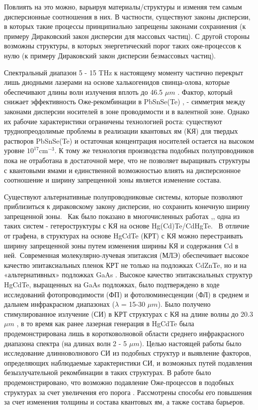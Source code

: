 \documentclass[../main.tex]{subfiles}
\begin{document}
Повлиять на это можно, варьируя материалы/структуры и изменяя тем самым дисперсионные соотношения в них. В частности,
существуют законы дисперсии, в которых такие процессы принципиально запрещены законами сохраниения (к примеру Дираковский 
закон дисперсии для массовых частиц). С другой стороны возможны структуры, в которых энергетический порог таких оже-процессов к нулю
(к примеру Дираковский закон дисперсии безмассовых частиц).

Спектральный диапазон 5 - 15 THz к настоящему моменту частично 
перекрыт лишь диодными лазерами на основе халькогенидов свинца-олова, которые обеспечивают длины 
волн излучения вплоть до 46.5 $\mu m$ \cite{Intro8}. Фактор, который снижает эффективность Оже-рекомбинации в PbSnSe(Te) \cite{Intro1}, \cite{Intro9}
- симметрия между законами дисперсии носителей в зоне проводимости и в валентной зоне. Однако их рабочие характеристики 
ограничены технологией роста: существуют труднопреодолимые проблемы в реализации квантовых ям (КЯ) для твердых растворов 
PbSnSe(Te) и остаточная концентрация носителей остается на высоком уровне $10^{17} \text{cm}^{-3}$. К тому же технология производства подобных
полупроводников пока не отработана в достаточной мере, что не позволяет выращивать структуры с квантовыми ямами и единственной возможностью
влиять на дисперсионное соотношение и ширину запрещенной зоны является изменение состава.

Существуют альтернативные полупроводниковые системы, которые позволяют
приблизиться к дираковскому закону дисперсии, но сохранить конечную ширину запрещенной зоны. 
Как было показано в многочисленных работах \cite{Rumyantsev:IOP:2018},\cite{Rumyantsev:2019}, одна из таких систем - гетероструктуры с КЯ на основе Hg(Cd)Te/CdHgTe. 
В отличие от графена, в структурах на основе HgCdTe (КРТ) с КЯ можно перестраивать ширину запрещенной зоны путем изменения ширины КЯ и 
содержания Cd в ней. Современная молекулярно-лучевая эпитаксия (МЛЭ) обеспечивает высокое качество эпитаксиальных пленок КРТ не только на подложках CdZnTe, 
но и на «альтернативных» подложках GaAs \cite{Varavin:2003}. Высокое качество эпитаксиальных структур \\HgCdTe, выращенных на GaAs подложках, было подтверждено в ходе исследований 
фотопроводимости (ФП) и фотолюминесценции (ФЛ) в среднем и дальнем инфракрасном диапазонах ($λ$ = 15-30 $\mu m$). Было получено 
стимулированное излучение (СИ) в КРТ структурах с КЯ на длине волны до 20.3 $\mu m$ \cite{Rumyantsev:IOP:2018}, в то время как ранее лазерная генерация в HgCdTe была 
продемонстрирована лишь в коротковолновой области среднего инфракрасного диапазона спектра (на длинах волн 2 - 5 $\mu m$). 
Целью настоящей работы было исследование длинноволнового СИ из подобных структур и выявление факторов, определяющих наблюдаемые характеристики СИ, и возможных путей подавления 
безызлучательной рекомбинации в таких структурах. В работе было продемонстрировано, что возможно подавление Оже-процессов в подобных структурах за счет увеличения его порога 
\cite{Rumyantsev:2019}. Рассмотрены 
способы его повышения за счет изменения толщины и состава квантовых ям, а также состава барьеров.
\end{document}
